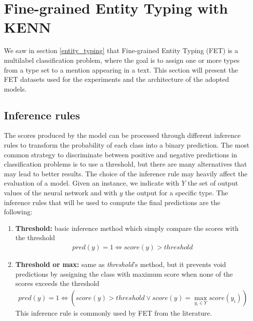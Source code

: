 \section{Fine-grained Entity Typing with KENN} \label{et_with_kenn}
We saw in section \ref{entity_typing} that Fine-grained Entity Typing (FET) is a multilabel classification problem, where the goal is to assign one or more types from a type set to a mention appearing in a text. This section will present the FET datasets used for the experiments and the architecture of the adopted models.






\subsection{Inference rules} \label{inference_rules}
The scores produced by the model can be processed through different inference rules to transform the probability of each class into a binary prediction. The most common strategy to discriminate between positive and negative predictions in classification problems is to use a threshold, but there are many alternatives that may lead to better results. The choice of the inference rule may heavily affect the evaluation of a model. Given an instance, we indicate with $Y$ the set of output values of the neural network and with $y$ the output for a specific type. The inference rules that will be used to compute the final predictions are the following:
\begin{enumerate}
    \item \textbf{Threshold:} basic inference method which simply compare the scores with the threshold
    \begin{gather*}
        pred(y) = 1 \iff score(y) > threshold
    \end{gather*}
    \item \textbf{Threshold or max:} same as \textit{threshold}'s method, but it prevents void predictions by assigning the class with maximum score when none of the scores exceeds the threshold
    \begin{gather*}
        pred(y) = 1 \iff (score(y) > threshold \vee score(y) = \max_{y_{i}\in Y}score(y_{i}))
    \end{gather*}
    This inference rule is commonly used by FET from the literature.
\end{enumerate}